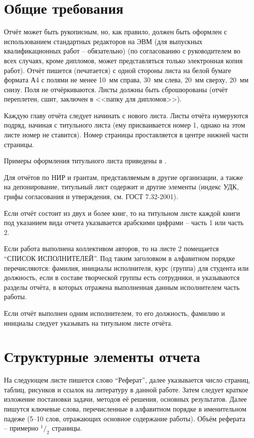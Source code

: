 \documentclass[utf8,14pt, coursreport]{G7-32}
\begin{document}
\section{Общие требования}

Отчёт может быть рукописным, но, как правило, должен быть оформлен с использованием стандартных редакторов на ЭВМ (для выпускных квалификационных работ -- обязательно) (по согласованию с руководителем во всех случаях, кроме дипломов, может представляться только электронная копия работ). Отчёт пишется (печатается) с одной стороны листа на белой бумаге формата А4 с полями не менее 10~мм справа, 30~мм слева, 20~мм сверху, 20~мм снизу. Поля не отчёркиваются. Листы должны быть сброшюрованы (отчёт переплетен, сшит, заключен в <<папку для дипломов>>).

Каждую главу отчёта следует начинать с нового листа. Листы отчёта нумеруются подряд, начиная с титульного листа (ему присваивается номер 1, однако на этом листе номер не ставится). Номер страницы проставляется в центре нижней части страницы.

Примеры оформления титульного листа приведены в \cite{dferules}.

Для отчётов по НИР и грантам, представляемым в другие организации, а также на депонирование, титульный лист содержит и другие элементы (индекс УДК, грифы согласования и утверждения, см. ГОСТ 7.32-2001).

Если отчёт состоит из двух и более книг, то на титульном листе каждой книги под указанием вида отчета указывается арабскими цифрами -- часть 1 или часть 2.

Если работа выполнена коллективом авторов, то на листе 2 помещается ``СПИСОК ИСПОЛНИТЕЛЕЙ''. Под таким заголовком в алфавитном порядке перечисляются: фамилия, инициалы исполнителя, курс (группа) для студента или должность, если в составе творческой группы есть сотрудники, и указываются разделы отчёта, в которых отражена выполненная данным исполнителем часть работы.

Если отчёт выполнен одним исполнителем, то его должность, фамилию и инициалы следует указывать на титульном листе отчёта.

\section{Структурные элементы отчета}

На следующем листе пишется слово ``Реферат'', далее указывается число страниц, таблиц, рисунков и ссылок на литературу в данной работе. Затем следует краткое изложение постановки задачи, методов её решения, основных результатов. Далее пишутся ключевые слова, перечисленные в алфавитном порядке в именительном падеже (5--10 слов, отражающих основное содержание работы). Объём реферата -- примерно $^1/_2$ страницы.
\end{document}

